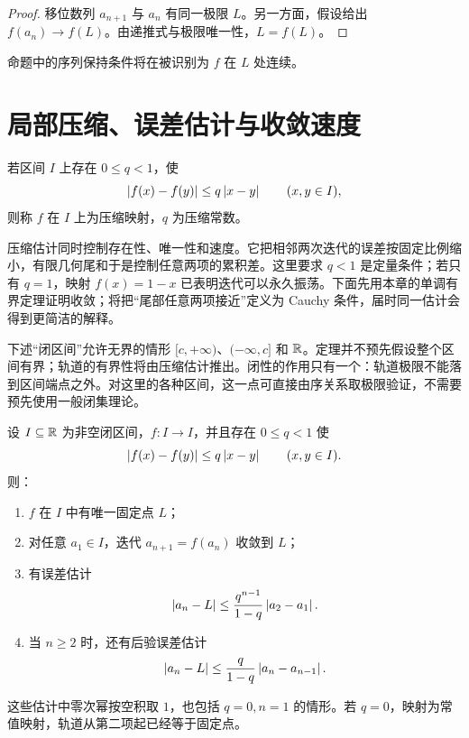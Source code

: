 \begin{proof}
移位数列 \(a_{n+1}\) 与 \(a_n\) 有同一极限 \(L\)。另一方面，假设给出
\(f(a_n)\to f(L)\)。由递推式与极限唯一性，\(L=f(L)\)。
\end{proof}

命题中的序列保持条件将在被识别为 \(f\) 在 \(L\) 处连续。

\section{局部压缩、误差估计与收敛速度}


\begin{definition}
若区间 \(I\) 上存在 \(0\le q<1\)，使
\[
 \left|f(x)-f(y)\right|\le q\left|x-y\right|\qquad(x,y\in I),
\]
则称 \(f\) 在 \(I\) 上为压缩映射，\(q\) 为压缩常数。
\end{definition}

压缩估计同时控制存在性、唯一性和速度。它把相邻两次迭代的误差按固定比例缩小，有限几何尾和于是控制任意两项的累积差。这里要求 \(q<1\) 是定量条件；若只有 \(q=1\)，映射 \(f(x)=1-x\) 已表明迭代可以永久振荡。下面先用本章的单调有界定理证明收敛；将把“尾部任意两项接近”定义为 Cauchy 条件，届时同一估计会得到更简洁的解释。

下述“闭区间”允许无界的情形
\([c,+\infty)\)、\((-\infty,c]\) 和 \(\mathbb{R}\)。定理并不预先假设整个区间有界；轨道的有界性将由压缩估计推出。闭性的作用只有一个：轨道极限不能落到区间端点之外。对这里的各种区间，这一点可直接由序关系取极限验证，不需要预先使用一般闭集理论。

\begin{theorem}[区间上的压缩迭代]
设 \(I\subseteq\mathbb{R}\) 为非空闭区间，\(f:I\to I\)，并且存在
\(0\le q<1\) 使
\[
 \left|f(x)-f(y)\right|\le q\left|x-y\right|\qquad(x,y\in I).
\]
则：
\begin{enumerate}
 \item \(f\) 在 \(I\) 中有唯一固定点 \(L\)；
 \item 对任意 \(a_1\in I\)，迭代 \(a_{n+1}=f(a_n)\) 收敛到 \(L\)；
 \item 有误差估计
 \[
  \left|a_n-L\right|\le\frac{q^{n-1}}{1-q}\left|a_2-a_1\right|.
  \]
 \item 当 \(n\ge2\) 时，还有后验误差估计
 \[
  \left|a_n-L\right|\le\frac q{1-q}\left|a_n-a_{n-1}\right|.
 \]
\end{enumerate}
这些估计中零次幂按空积取 \(1\)，也包括 \(q=0,n=1\) 的情形。若 \(q=0\)，映射为常值映射，轨道从第二项起已经等于固定点。
\end{theorem}

